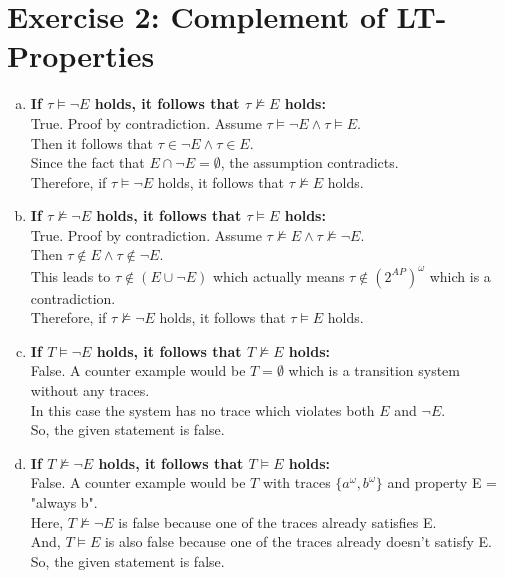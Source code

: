\documentclass{article}
\begin{document}
\newpage
\section*{Exercise 2: Complement of LT-Properties}

\begin{enumerate}[(a)]
    \item \textbf{If $\tau \vDash \neg E$ holds, it follows that $\tau \nvDash E$ holds:}\\
    True. Proof by contradiction. Assume $\tau \vDash \neg E \wedge \tau \vDash E$. \\
    Then it follows that $\tau \in \neg E \wedge \tau \in E$. \\
    Since the fact that $E \cap \neg E = \emptyset$, the assumption contradicts.\\
    Therefore, if $\tau \vDash \neg E$ holds, it follows that $\tau \nvDash E$ holds.
    
    \item \textbf{If $\tau \nvDash \neg E$ holds, it follows that $\tau \vDash E$ holds:} \\
    True. Proof by contradiction. Assume $\tau \nvDash E \wedge \tau \nvDash \neg E$. \\
    Then $\tau \notin E \wedge \tau \notin \neg E$.\\
    This leads to $\tau \notin (E \cup \neg E)$ which actually means $\tau \notin (2^{AP})^\omega$ which is a contradiction.\\
    Therefore, if $\tau \nvDash \neg E$ holds, it follows that $\tau \vDash E$ holds.
    
    \item \textbf{If $T \vDash \neg E$ holds, it follows that $T \nvDash E$ holds:}\\
    False. A counter example would be $T = \emptyset$ which is a transition system without any traces.\\
    In this case the system has no trace which violates both $E$ and $\neg E$.\\
    So, the given statement is false.
    
    \item \textbf{If $T \nvDash \neg E$ holds, it follows that $T \vDash E$ holds:}\\
    False. A counter example would be $T$ with traces $\{ {a}^\omega , {b}^\omega \}$ and property E = "always b".\\
    Here, $T \nvDash \neg E$ is false because one of the traces already satisfies E.\\
    And, $T \vDash E$ is also false because one of the traces already doesn't satisfy E. \\
    So, the given statement is false.

\end{enumerate}
\end{document}
